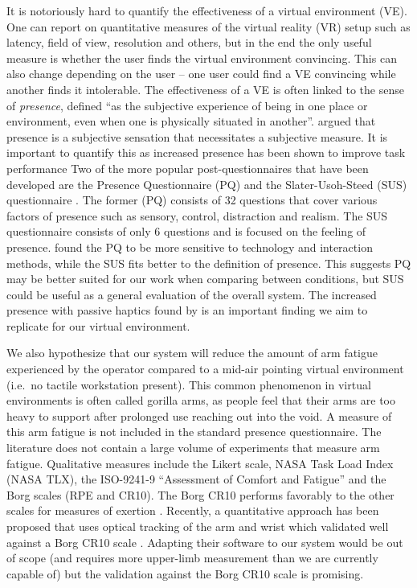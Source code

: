 It is notoriously hard to quantify the effectiveness of a virtual environment (VE).
One can report on quantitative measures of the virtual reality (VR) setup such as latency, field of view, resolution and others, but in the end the only useful measure is whether the user finds the virtual environment convincing.
This can also change depending on the user -- one user could find a VE convincing while another finds it intolerable.
The effectiveness of a VE is often linked to the sense of \emph{presence}, defined ``as the subjective experience of being in one place or environment, even when one is physically situated in another''\citep{witmer_measuring_1998}.
\citet{sheridan_musings_1992} argued that presence is a subjective sensation that necessitates a subjective measure.
It is important to quantify this as increased presence has been shown to improve task performance \citep{youngblut_relationship_2003}
Two of the more popular post-questionnaires that have been developed are the Presence Questionnaire (PQ) \citep{witmer_measuring_1998} and the Slater-Usoh-Steed (SUS) questionnaire \citep{slater_depth_1994}.
The former (PQ) consists of 32 questions that cover various factors of presence such as sensory, control, distraction and realism.
The SUS questionnaire consists of only 6 questions and is focused on the feeling of presence.
\citet{nystad_comparison_2004} found the PQ to be more sensitive to technology and interaction methods, while the SUS fits better to the definition of presence.
This suggests PQ may be better suited for our work when comparing between conditions, but SUS could be useful as a general evaluation of the overall system.
The increased presence with passive haptics found by \citet{insko_passive_2001} is an important finding we aim to replicate for our virtual environment.

We also hypothesize that our system will reduce the amount of arm fatigue experienced by the operator compared to a mid-air pointing virtual environment (i.e.\ no tactile workstation present).
This common phenomenon in virtual environments is often called gorilla arms, as people feel that their arms are too heavy to support after prolonged use reaching out into the void.
A measure of this arm fatigue is not included in the standard presence questionnaire.
The literature does not contain a large volume of experiments that measure arm fatigue.
Qualitative measures include the Likert scale, NASA Task Load Index (NASA TLX), the ISO-9241-9 ``Assessment of Comfort and Fatigue'' and the Borg scales (RPE and CR10).
The Borg CR10 performs favorably to the other scales for measures of exertion \citep{grant_comparison_1999}.
Recently, a quantitative approach has been proposed that uses optical tracking of the arm and wrist which validated well against a Borg CR10 scale \citep{hincapie-ramos_consumed_2014}.
Adapting their software to our system would be out of scope (and requires more upper-limb measurement than we are currently capable of) but the validation against the Borg CR10 scale is promising.

